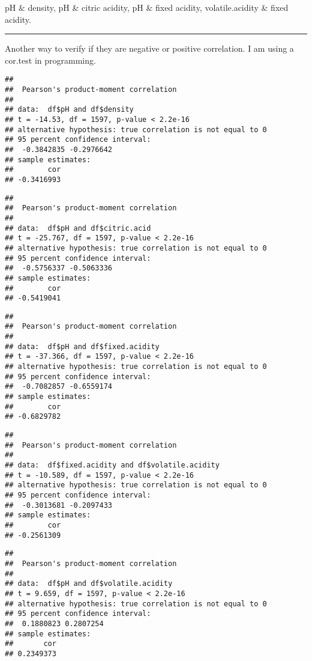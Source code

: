 \documentclass[]{article}
\begin{document}
pH \& density, pH \& citric acidity, pH \& fixed acidity,
volatile.acidity \& fixed acidity.

\begin{center}\rule{0.5\linewidth}{\linethickness}\end{center}

Another way to verify if they are negative or positive correlation. I am
using a cor.test in programming.

\begin{verbatim}
## 
##  Pearson's product-moment correlation
## 
## data:  df$pH and df$density
## t = -14.53, df = 1597, p-value < 2.2e-16
## alternative hypothesis: true correlation is not equal to 0
## 95 percent confidence interval:
##  -0.3842835 -0.2976642
## sample estimates:
##        cor 
## -0.3416993
\end{verbatim}

\begin{verbatim}
## 
##  Pearson's product-moment correlation
## 
## data:  df$pH and df$citric.acid
## t = -25.767, df = 1597, p-value < 2.2e-16
## alternative hypothesis: true correlation is not equal to 0
## 95 percent confidence interval:
##  -0.5756337 -0.5063336
## sample estimates:
##        cor 
## -0.5419041
\end{verbatim}

\begin{verbatim}
## 
##  Pearson's product-moment correlation
## 
## data:  df$pH and df$fixed.acidity
## t = -37.366, df = 1597, p-value < 2.2e-16
## alternative hypothesis: true correlation is not equal to 0
## 95 percent confidence interval:
##  -0.7082857 -0.6559174
## sample estimates:
##        cor 
## -0.6829782
\end{verbatim}

\begin{verbatim}
## 
##  Pearson's product-moment correlation
## 
## data:  df$fixed.acidity and df$volatile.acidity
## t = -10.589, df = 1597, p-value < 2.2e-16
## alternative hypothesis: true correlation is not equal to 0
## 95 percent confidence interval:
##  -0.3013681 -0.2097433
## sample estimates:
##        cor 
## -0.2561309
\end{verbatim}

\begin{verbatim}
## 
##  Pearson's product-moment correlation
## 
## data:  df$pH and df$volatile.acidity
## t = 9.659, df = 1597, p-value < 2.2e-16
## alternative hypothesis: true correlation is not equal to 0
## 95 percent confidence interval:
##  0.1880823 0.2807254
## sample estimates:
##       cor 
## 0.2349373
\end{verbatim}
\end{document}

